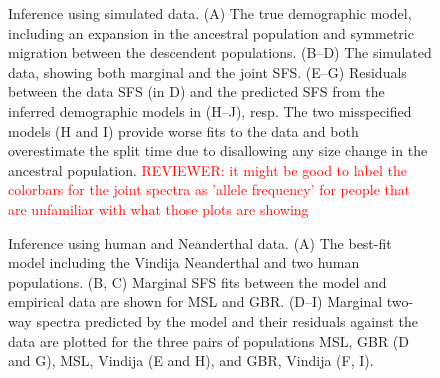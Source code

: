 \documentclass[]{article}
\newcommand{\reviewercomment}[1]{{\textcolor{red}{REVIEWER: #1}}}
\begin{document}



\clearpage

\begin{figure}
    \caption{
        Inference using simulated data. (A) The true demographic model,
        including an expansion in the ancestral population and symmetric
        migration between the descendent populations. (B--D) The simulated
        data, showing both marginal and the joint SFS. (E--G) Residuals
        between the data SFS (in D) and the predicted SFS from the inferred
        demographic models in (H--J), resp.  The two misspecified models (H and
        I) provide worse fits to the data and both overestimate the split time
        due to disallowing any size change in the ancestral population.
        \reviewercomment{it might be good to label the colorbars for the joint spectra as 'allele frequency' for people that are unfamiliar with what those plots are showing}
    }
    \label{fig:im}
\end{figure}

\begin{figure}
    \caption{
        Inference using human and Neanderthal data.
        (A) The best-fit model including the Vindija Neanderthal and two human
        populations.
        (B, C) Marginal SFS fits between the model and empirical data are shown
        for MSL and GBR.
        (D--I) Marginal two-way spectra predicted by the model and their residuals 
        against the data are plotted for the three pairs of populations MSL, GBR 
        (D and G), MSL, Vindija (E and H), and GBR, Vindija (F, I).
    }
    \label{fig:humans}
\end{figure}
\end{document}
